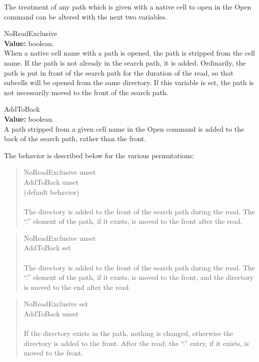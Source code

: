The treatment of any path which is given with a native cell to open in
the {\cb Open} command can be altered with the next two variables.

\begin{description}
\item{\et NoReadExclusive}\\
{\bf Value:} boolean.\\
When a native cell name with a path is opened, the path is
stripped from the cell name.  If the path is not already in the search
path, it is added.  Ordinarily, the path is put in front of the search
path for the duration of the read, so that subcells will be opened
from the same directory.  If this variable is set, the path is not
necessarily moved to the front of the search path.

\item{\et AddToBack}\\
{\bf Value:} boolean.\\
A path stripped from a given cell name in the {\cb Open} command is
added to the back of the search path, rather than the front.
\end{description}

The behavior is described below for the various permutations:

\begin{quote}
{\et NoReadExclusive} unset\\
{\et AddToBack} unset\\
(default behavior)\\
\\
The directory is added to the front of the search path during the read.
The ``.'' element of the path, if it exists, is moved to the front
after the read.
\end{quote}

\begin{quote}
{\et NoReadExclusive} unset\\
{\et AddToBack} set\\
\\
The directory is added to the front of the search path during the read.
The ``.'' element of the path, if it exists, is moved to the front,
and the directory is moved to the end after the read.
\end{quote}

\begin{quote}
{\et NoReadExclusive} set\\
{\et AddToBack} unset\\
\\
If the directory exists in the path, nothing is changed, otherwise the
directory is added to the front.  After the read, the ``.'' entry, if it
exists, is moved to the front.
\end{quote}

